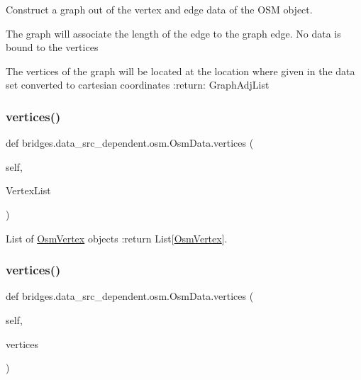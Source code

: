 Construct a graph out of the vertex and edge data of the O\+SM object. 

The graph will associate the length of the edge to the graph edge. No data is bound to the vertices

The vertices of the graph will be located at the location where given in the data set converted to cartesian coordinates \+:return\+: Graph\+Adj\+List \mbox{\label{classbridges_1_1data__src__dependent_1_1osm_1_1_osm_data_a9d254d1ef4043909d4d2bd4427daae39}} 
\subsubsection{\texorpdfstring{vertices()}{vertices()}\hspace{0.1cm}{\footnotesize\ttfamily [1/3]}}
{\footnotesize\ttfamily def bridges.\+data\+\_\+src\+\_\+dependent.\+osm.\+Osm\+Data.\+vertices (\begin{DoxyParamCaption}\item[{}]{self,  }\item[{}]{Vertex\+List }\end{DoxyParamCaption})}



List of \hyperlink{classbridges_1_1data__src__dependent_1_1osm_1_1_osm_vertex}{Osm\+Vertex} objects \+:return List\mbox{[}\hyperlink{classbridges_1_1data__src__dependent_1_1osm_1_1_osm_vertex}{Osm\+Vertex}\mbox{]}. 

\mbox{\label{classbridges_1_1data__src__dependent_1_1osm_1_1_osm_data_aaf96716b8b7e7c5810d8858cb3463a8d}} 
\subsubsection{\texorpdfstring{vertices()}{vertices()}\hspace{0.1cm}{\footnotesize\ttfamily [2/3]}}
{\footnotesize\ttfamily def bridges.\+data\+\_\+src\+\_\+dependent.\+osm.\+Osm\+Data.\+vertices (\begin{DoxyParamCaption}\item[{}]{self,  }\item[{}]{vertices }\end{DoxyParamCaption})}

